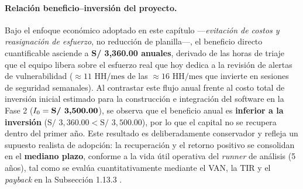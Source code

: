 \paragraph{Relación beneficio--inversión del proyecto.}
Bajo el enfoque económico adoptado en este capítulo ---\textit{evitación de costos y reasignación de esfuerzo}, no reducción de planilla---, el beneficio directo cuantificable asciende a \textbf{S/ 3,360.00 anuales}, derivado de las horas de triaje que el equipo libera sobre el esfuerzo real que hoy dedica a la revisión de alertas de vulnerabilidad ($\approx 11\text{ HH/mes}$ de las $\approx 16\text{ HH/mes}$ que invierte en sesiones de seguridad semanales). %
Al contrastar este flujo anual frente al costo total de inversión inicial estimado para la construcción e integración del software en la Fase 2 ($I_0 = \text{\textbf{S/ 3,500.00}}$), se observa que el beneficio anual es \textbf{inferior a la inversión} ($\text{S/ } 3,360.00 < \text{S/ } 3,500.00$), por lo que el capital no se recupera dentro del primer año. %
Este resultado es deliberadamente conservador y refleja un supuesto realista de adopción: la recuperación y el retorno positivo se consolidan en el \textbf{mediano plazo}, conforme a la vida útil operativa del \textit{runner} de análisis (5 años), tal como se evalúa cuantitativamente mediante el VAN, la TIR y el \textit{payback} en la Subsección 1.13.3 \parencite{torres2026proyecto}. %

